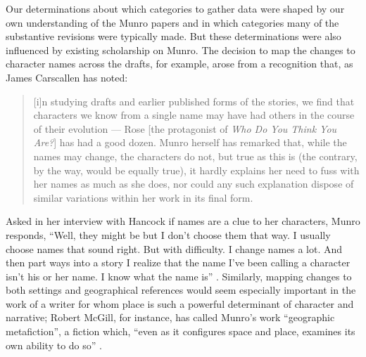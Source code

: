 \begin{paper}
Our determinations about which categories to gather data were shaped by
our own understanding of the Munro papers and in which categories many
of the substantive revisions were typically made. But these
determinations were also influenced by existing scholarship on Munro.
The decision to map the changes to character names across the drafts,
for example, arose from a recognition that, as James Carscallen has
noted:

\begin{quote}
{[}i{]}n studying drafts and earlier published forms of the stories, we
find that characters we know from a single name may have had others in the course of their evolution –– Rose {[}the protagonist of \emph{Who Do You Think You
Are?}{]} has had a good dozen. Munro herself has remarked that, while
the names may change, the characters do not, but true as this is (the contrary, by the way, would be equally true), it hardly explains her need to fuss with her names as much as she does, nor could any such
explanation dispose of similar variations within her work in its final
form. 

\begin{flushright}
    \parencite[85--86]{carscallen_other_1992}
\end{flushright}
\end{quote}

Asked in her interview with Hancock if names are a clue to her
characters, Munro responds, ``Well, they might be but I don't choose
them that way. I usually choose names that sound right. But with
difficulty. I change names a lot. And then part ways into a story I
realize that the name I've been calling a character isn't his or her
name. I know what the name is'' \citep[101]{hancock_interview_1982}. Similarly, mapping
changes to both settings and geographical references would seem
especially important in the work of a writer for whom place is such a
powerful determinant of character and narrative; Robert McGill, for
instance, has called Munro's work ``geographic metafiction'', a fiction
which, ``even as it configures space and place, examines its own ability
to do so'' \citep[103]{mcgill_where_2002}.


\end{paper}
